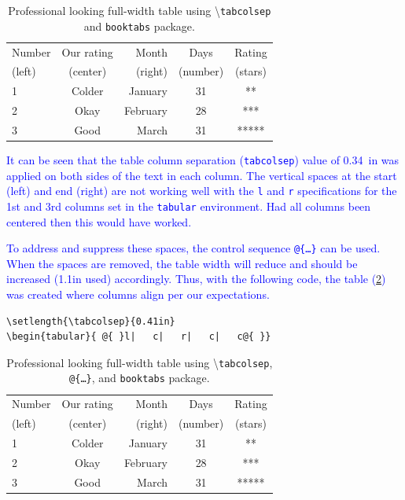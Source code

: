 \documentclass[phd]{ndsu-thesis-2022}
\newcommand\italk[1]{\textcolor{blue}{#1}}  %
\newcommand\cmd[1]{\textbackslash\texttt{#1}}  %
\newcommand\vb[1]{\textcolor{blue}{\texttt{#1}}}%
\begin{document}
\begin{table}[ht!]
\centering
\caption{Professional looking full-width table using \cmd{tabcolsep} and \texttt{booktabs} package.}
\setlength{\tabcolsep}{0.34in}
\begin{tabular}{ l|   c|   r|   c|   c}
\toprule
Number & Our rating & Month & Days & Rating\\
(left) & (center)   & (right) & (number) & (stars)\\
\midrule
1 & Colder & January & 31 & **\\
2 & Okay   & February & 28 & ***\\
3 & Good   & March & 31 & *****\\
\bottomrule
\end{tabular}
\label{tab23}
\end{table}

\italk{It can be seen that the table column separation (\vb{tabcolsep}) value of 0.34~in was applied on both sides of the text in each column. The vertical spaces at the start (left) and end (right) are not working well with the \vb{l} and \vb{r} specifications for the 1st and 3rd columns set in the \vb{tabular} environment. Had all columns been centered then this would have worked.}

\italk{To address and suppress these spaces, the control sequence \vb{@\{\ldots\}} can be used. When the spaces are removed, the table width will reduce and should be increased (1.1in used) accordingly. Thus, with the following code, the table (\cref{tab24}) was created where columns align per our expectations.
}

{\singlespacing
\begin{verbatim}
\setlength{\tabcolsep}{0.41in}
\begin{tabular}{ @{ }l|   c|   r|   c|   c@{ }}
\end{verbatim}
}

\begin{table}[ht!]
\centering
\caption{Professional looking full-width table using \cmd{tabcolsep}, \texttt{@\{\ldots\}}, and \texttt{booktabs} package.}
\setlength{\tabcolsep}{0.41in}
\begin{tabular}{ @{ }l|   c|   r|   c|   c@{ }}
\toprule
Number & Our rating & Month & Days & Rating\\
(left) & (center)   & (right) & (number) & (stars)\\
\midrule
1 & Colder & January & 31 & **\\
2 & Okay   & February & 28 & ***\\
3 & Good   & March & 31 & *****\\
\bottomrule
\end{tabular}
\label{tab24}
\end{table}
\end{document}
